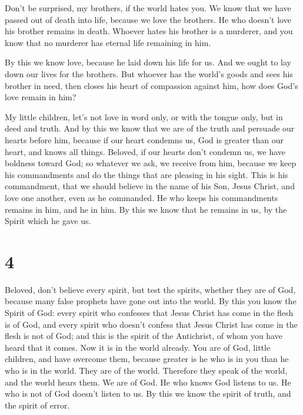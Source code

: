 Don't be surprised, my brothers, if the world hates you.
 We know that we have passed out of death into life,
because we love the brothers. He who doesn't love his brother remains in
death.  Whoever hates his brother is a murderer, and you
know that no murderer has eternal life remaining in him.

 By this we know love, because he laid down his life for
us. And we ought to lay down our lives for the brothers. 
But whoever has the world's goods and sees his brother in need, then
closes his heart of compassion against him, how does God's love remain
in him?

 My little children, let's not love in word only, or with
the tongue only, but in deed and truth.  And by this we
know that we are of the truth and persuade our hearts before him,
 because if our heart condemns us, God is greater than our
heart, and knows all things.  Beloved, if our hearts don't
condemn us, we have boldness toward God;  so whatever we
ask, we receive from him, because we keep his commandments and do the
things that are pleasing in his sight.  This is his
commandment, that we should believe in the name of his Son, Jesus
Christ, and love one another, even as he commanded.  He who
keeps his commandments remains in him, and he in him. By this we know
that he remains in us, by the Spirit which he gave us.

\hypertarget{section-3}{%
\section{4}\label{section-3}}

 Beloved, don't believe every spirit, but test the spirits,
whether they are of God, because many false prophets have gone out into
the world.  By this you know the Spirit of God: every spirit
who confesses that Jesus Christ has come in the flesh is of God,
 and every spirit who doesn't confess that Jesus Christ has
come in the flesh is not of God; and this is the spirit of the
Antichrist, of whom you have heard that it comes. Now it is in the world
already.  You are of God, little children, and have overcome
them, because greater is he who is in you than he who is in the world.
 They are of the world. Therefore they speak of the world,
and the world hears them.  We are of God. He who knows God
listens to us. He who is not of God doesn't listen to us. By this we
know the spirit of truth, and the spirit of error.

